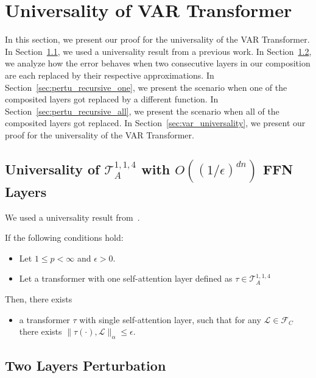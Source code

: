 \section{Universality of VAR Transformer}\label{sec:var_mainresult}

In this section, we present our proof for the universality of the VAR Transformer.
In Section~\ref{sec:universality_2}, we used a universality result from a previous work.
In Section~\ref{sec:two_layer_pertu}, we analyze how the error behaves when two consecutive layers in our composition are each replaced by their respective approximations.
In Section~\ref{sec:pertu_recursive_one}, we present the scenario when one of the composited layers got replaced by a different function.
In Section~\ref{sec:pertu_recursive_all}, we present the scenario when all of the composited layers got replaced. 
In Section~\ref{sec:var_universality}, we present our proof for the universality of the VAR Transformer.


\subsection{Universality of \texorpdfstring{$\mathcal{T}_A^{1,1,4}$}{} with \texorpdfstring{$O((1/ \epsilon)^{d 
n})$}{} FFN Layers}
\label{sec:universality_2}

We used a universality result from~\cite{hwg+24}.

\begin{lemma}
\label{lem:PT_uni_multi_layer_FF2}
    If the following conditions hold: 
    \begin{itemize}
        \item Let $1 \leq p < \infty$ and $\epsilon > 0$.
        \item Let a transformer with one self-attention layer defined as $\tau \in \mathcal{T}^{1,1,4}_A$
    \end{itemize}

    Then, there exists
    \begin{itemize}
        \item a transformer $\tau$ with single self-attention layer, such that for any $\mathcal{L} \in \mathcal{F}_{C}$ there exists
    $ \| \tau ( \cdot), \mathcal{L}\|_\alpha \leq \epsilon$.
    \end{itemize}
\end{lemma}


\subsection{Two Layers Perturbation}\label{sec:two_layer_pertu}

